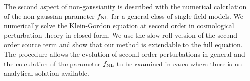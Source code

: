 The second aspect of non-gaussianity is described with the numerical calculation
of the non-gaussian parameter $f_{\mathrm{NL}}$ for a general class of single field models.
We numerically solve the Klein-Gordon equation at second
order in cosmological perturbation theory in closed form. 
We use the slow-roll
version of the second order source term and show that our method is extendable
to the full equation.
The procedure allows the evolution of second order
perturbations in general and the calculation of the parameter
$f_{\mathrm{NL}}$ to be examined in cases where there is no analytical solution available. 
